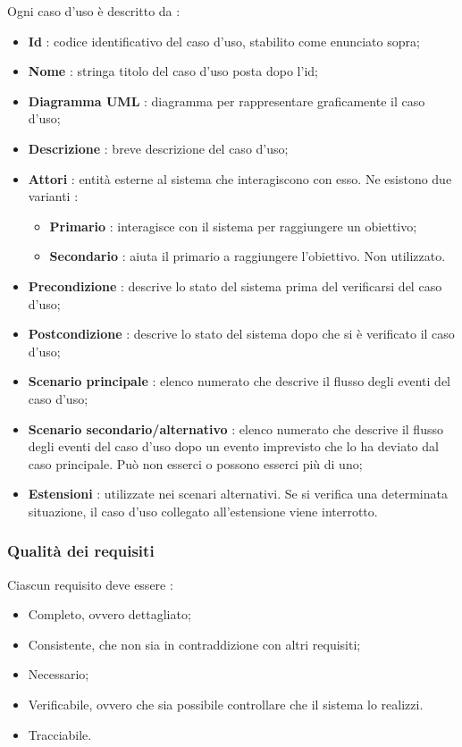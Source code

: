 Ogni caso d'uso è descritto da : 
\begin{itemize}
    \item \textbf{Id} : codice identificativo del caso d'uso, stabilito come enunciato sopra;
    \item \textbf{Nome} : stringa titolo del caso d'uso posta dopo l'id;
    \item \textbf{Diagramma UML} : diagramma per rappresentare graficamente il caso d'uso;
    \item \textbf{Descrizione} : breve descrizione del caso d'uso;
    \item \textbf{Attori} : entità esterne al sistema che interagiscono con esso. Ne esistono due varianti : 
    \begin{itemize}
    \item \textbf{Primario} : interagisce con il sistema per raggiungere un obiettivo;
    \item \textbf{Secondario} : aiuta il primario a raggiungere l'obiettivo. Non utilizzato.
    \end{itemize}
    \item \textbf{Precondizione} : descrive lo stato del sistema prima del verificarsi del caso d'uso;
    \item \textbf{Postcondizione} : descrive lo stato del sistema dopo che si è verificato il caso d'uso;
    \item \textbf{Scenario principale} : elenco numerato che descrive il flusso degli eventi del caso d'uso;
    \item \textbf{Scenario secondario/alternativo} : elenco numerato che descrive il flusso degli eventi del caso d'uso dopo un evento imprevisto che lo ha deviato dal caso principale. Può non esserci o possono esserci più di uno;
    \item \textbf{Estensioni} : utilizzate nei scenari alternativi. Se si verifica una determinata situazione, il caso d'uso collegato all'estensione viene interrotto.
\end{itemize}

\subsubsection{Qualità dei requisiti}
Ciascun requisito deve essere :
\begin{itemize}
  \item Completo, ovvero dettagliato;
  \item Consistente, che non sia in contraddizione con altri requisiti;
  \item Necessario;
  \item Verificabile, ovvero che sia possibile controllare che il sistema lo realizzi.
  \item Tracciabile.
\end{itemize}
